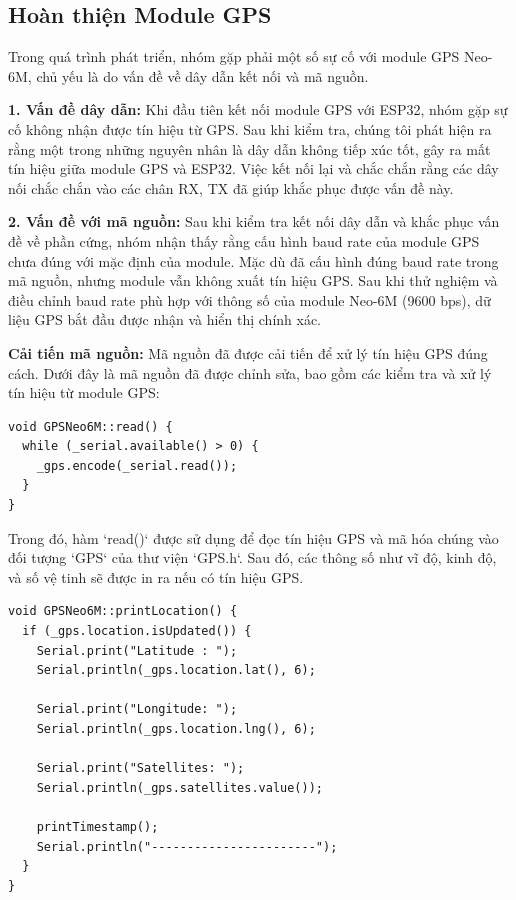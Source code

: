 \subsection{Hoàn thiện Module GPS}
Trong quá trình phát triển, nhóm gặp phải một số sự cố với module GPS Neo-6M, chủ yếu là do vấn đề về dây dẫn kết nối và mã nguồn.

\textbf{1. Vấn đề dây dẫn:}  
Khi đầu tiên kết nối module GPS với ESP32, nhóm gặp sự cố không nhận được tín hiệu từ GPS. Sau khi kiểm tra, chúng tôi phát hiện ra rằng một trong những nguyên nhân là dây dẫn không tiếp xúc tốt, gây ra mất tín hiệu giữa module GPS và ESP32. Việc kết nối lại và chắc chắn rằng các dây nối chắc chắn vào các chân RX, TX đã giúp khắc phục được vấn đề này.

\textbf{2. Vấn đề với mã nguồn:}  
Sau khi kiểm tra kết nối dây dẫn và khắc phục vấn đề về phần cứng, nhóm nhận thấy rằng cấu hình baud rate của module GPS chưa đúng với mặc định của module. Mặc dù đã cấu hình đúng baud rate trong mã nguồn, nhưng module vẫn không xuất tín hiệu GPS. Sau khi thử nghiệm và điều chỉnh baud rate phù hợp với thông số của module Neo-6M (9600 bps), dữ liệu GPS bắt đầu được nhận và hiển thị chính xác.

\textbf{Cải tiến mã nguồn:}  
Mã nguồn đã được cải tiến để xử lý tín hiệu GPS đúng cách. Dưới đây là mã nguồn đã được chỉnh sửa, bao gồm các kiểm tra và xử lý tín hiệu từ module GPS:

\begin{verbatim}
void GPSNeo6M::read() {
  while (_serial.available() > 0) {
    _gps.encode(_serial.read());
  }
}
\end{verbatim}

Trong đó, hàm `read()` được sử dụng để đọc tín hiệu GPS và mã hóa chúng vào đối tượng `GPS` của thư viện `GPS.h`. Sau đó, các thông số như vĩ độ, kinh độ, và số vệ tinh sẽ được in ra nếu có tín hiệu GPS.

\begin{verbatim}
void GPSNeo6M::printLocation() {
  if (_gps.location.isUpdated()) {
    Serial.print("Latitude : ");
    Serial.println(_gps.location.lat(), 6);
    
    Serial.print("Longitude: ");  
    Serial.println(_gps.location.lng(), 6);
    
    Serial.print("Satellites: "); 
    Serial.println(_gps.satellites.value());
    
    printTimestamp();
    Serial.println("-----------------------");
  }
}
\end{verbatim}

